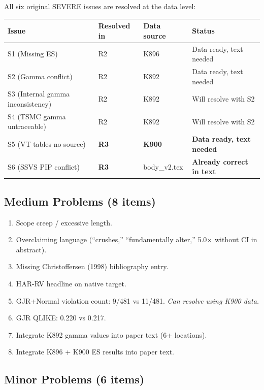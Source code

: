 \documentclass[12pt,a4paper]{article}
\begin{document}
All six original SEVERE issues are resolved at the data level:

\begin{center}
\small
\begin{tabular}{llll}
\toprule
Issue & Resolved in & Data source & Status \\
\midrule
S1 (Missing ES) & R2 & K896 & Data ready, text needed \\
S2 (Gamma conflict) & R2 & K892 & Data ready, text needed \\
S3 (Internal gamma inconsistency) & R2 & K892 & Will resolve with S2 \\
S4 (TSMC gamma untraceable) & R2 & K892 & Will resolve with S2 \\
S5 (VT tables no source) & \textbf{R3} & \textbf{K900} & \textbf{Data ready, text needed} \\
S6 (SSVS PIP conflict) & \textbf{R3} & body\_v2.tex & \textbf{Already correct in text} \\
\bottomrule
\end{tabular}
\end{center}

\subsection*{\textcolor{warncolor}{Medium Problems (8 items)}}

\begin{enumerate}[label=\textcolor{warncolor}{M\arabic*}]
\item Scope creep / excessive length.
\item Overclaiming language (``crushes,'' ``fundamentally alter,'' 5.0$\times$ without CI in abstract).
\item Missing Christoffersen (1998) bibliography entry.
\item HAR-RV headline on native target.
\item GJR+Normal violation count: 9/481 vs 11/481. \textit{Can resolve using K900 data.}
\item GJR QLIKE: 0.220 vs 0.217.
\item Integrate K892 gamma values into paper text (6+ locations).
\item Integrate K896 + K900 ES results into paper text.
\end{enumerate}

\subsection*{Minor Problems (6 items)}
\end{document}
